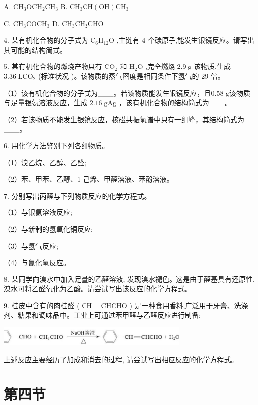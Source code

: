 \documentclass[10pt]{article}
\begin{document}
A. \({\mathrm{{CH}}}_{3}{\mathrm{{OCH}}}_{2}{\mathrm{{CH}}}_{3}\) B. \({\mathrm{{CH}}}_{3}\mathrm{{CH}}\left( \mathrm{{OH}}\right) {\mathrm{{CH}}}_{3}\)

C. \({\mathrm{{CH}}}_{3}{\mathrm{{COCH}}}_{3}\) D. \({\mathrm{{CH}}}_{3}{\mathrm{{CH}}}_{2}\mathrm{{CHO}}\)

4. 某有机化合物的分子式为 \({\mathrm{C}}_{6}{\mathrm{H}}_{12}\mathrm{O}\) ,主链有 4 个碳原子,能发生银镜反应。请写出其可能的结构简式。

5. 某有机化合物的燃烧产物只有 \({\mathrm{{CO}}}_{2}\) 和 \({\mathrm{H}}_{2}\mathrm{O}\) ,完全燃烧 \({2.9}\mathrm{\;g}\) 该物质,生成 \({3.36}\mathrm{\;L}{\mathrm{{CO}}}_{2}\) (标准状况 )。该物质的蒸气密度是相同条件下氢气的 29 倍。

（1）该有机化合物的分子式为\_\_\_。若该物质能发生银镜反应，且0.58 g该物质与足量银氨溶液反应，生成 \({2.16}\mathrm{\;g}\mathrm{{Ag}}\) ，该有机化合物的结构简式为\_\_\_。

（2）若该物质不能发生银镜反应，核磁共振氢谱中只有一组峰，其结构简式为\_\_\_。

6. 用化学方法鉴别下列各组物质。

（1）溴乙烷、乙醇、乙醛;

（2）苯、甲苯、乙醇、1-己烯、甲醛溶液、苯酚溶液。

7. 分别写出丙醛与下列物质反应的化学方程式。

（1）与银氨溶液反应;

（2）与新制的氢氧化铜反应;

（3）与氢气反应;

（4）与氰化氢反应。

8. 某同学向溴水中加入足量的乙醛溶液, 发现溴水褪色。这是由于醛基具有还原性, 溴水可将乙醛氧化为乙酸。请尝试写出该反应的化学方程式。

9. 桂皮中含有的肉桂醛 ( \(\mathrm{{CH}} = \mathrm{{CHCHO}}\) ) 是一种食用香料,广泛用于牙膏、洗涤剂、糖果和调味品中。工业上可通过苯甲醛与乙醛反应进行制备:

\begin{center}
\includegraphics[max width=0.7\textwidth]{images/0190efc5-b58a-7c43-bfb0-e0a030df9cfd_77_961628.jpg}
\end{center}

上述反应主要经历了加成和消去的过程, 请尝试写出相应反应的化学方程式。

\section*{第四节}
\end{document}
